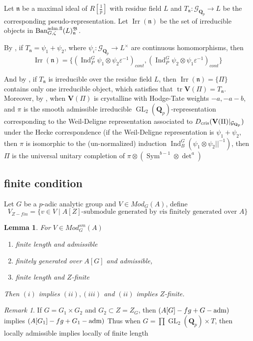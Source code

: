 \documentclass[leqno]{amsart}
\newcommand{\Ban}{\textnormal{Ban}^{\textnormal{adm.fl}}}
\newcommand{\B}{\mathfrak B}
\newcommand{\Gp}{\mathcal{G}_{\Qp}} %
\newcommand{\cris}{\textnormal{cris}}
\DeclareMathOperator{\Irr}{Irr}
\newcommand{\adm}{\textnormal{adm}}
\DeclareMathOperator{\GL}{GL}
\DeclareMathOperator{\mtr}{tr}
\DeclareMathOperator{\Sym}{Sym}
\newcommand{\Qp}{\mathbf{Q}_p}
\newcommand{\fn}{\mathfrak{n}}
\DeclareMathOperator{\Ind}{Ind}
\newtheorem{lem}[thm]{Lemma}
\theoremstyle{definition}
\theoremstyle{remark}
\newtheorem{rem}[thm]{Remark}
\begin{document}
Let $\fn$ be a maximal ideal of  $R[\frac{1}{p}]$
with residue field  $L$ and 
$T_\fn\colon \Gp\to L$ 
be the corresponding pseudo-representation.
Let  $\Irr(\fn)$
be the set of irreducible objects in  $\Ban_{G,\zeta}(L)^\B_{\fn}$.

By \cite[Cor 8.15]{pask}, 
if $T_\fn=\psi_1+\psi_2$,
where  $\psi_i\colon \Gp\to L^\times$
are continuous homomorphisms, then  
\begin{equation}\label{eq:comple1}
	\Irr(\fn)=\{(\Ind_P^G\psi_1\otimes\psi_2\varepsilon^{-1})_{cont},
	(\Ind_P^G\psi_2\otimes\psi_1\varepsilon^{-1})_{cont}\}
\end{equation}

And by \cite[Cor 8.14]{pask}, 
if $T_\fn$ is irreducible over the residue field $L$, 
then $\Irr(\fn)=\{\Pi\}$ contains only one irreducible object,
which satisfies that $\mtr\mathbf{V}(\Pi)=T_\fn$.
Moreover, by \cite[Thm. 1.3]{CDP},
when $\mathbf{V}(\Pi)$ is crystalline with Hodge-Tate weights $-a,-a-b$,
and $\pi$ is the smooth admissible irreducible
$\GL_2(\Qp)$-representation
corresponding to the Weil-Deligne representation
associated to  $D_{\cris}(\mathbf{V}(\Pi)\vert_{\Gp})$
under the Hecke correspondence
(if the Weil-Deligne representation is $\psi_1+\psi_2$,
then $\pi$ is isomorphic to 
the (un-normalized) induction $\Ind_B^G(\psi_1\otimes\psi_2||^{-1})$,
then $\Pi$ is the universal unitary completion
of  $\pi\otimes(\Sym^{b-1}\otimes \det^a)$


\subsection{finite condition}

Let $G$ be a  $p$-adic analytic group
and  $V\in Mod_G(A)$, define 
 \[
	V_{Z-fin}=
	\{v\in V\mid \text{$A[Z]$-submodule generated by  $v$
	is finitely generated over  $A$}\}
\]
\begin{lem}
	For $V\in Mod_G^{sm}(A)$
	\begin{enumerate}[label=(\alph*)]
		\item finite length and admissible
		\item finitely generated over $A[G]$
			and admissible, 
		\item finite length and $Z$-finite
	\end{enumerate}
	Then $(i)$ implies $(ii), (iii)$
	and $(ii)$ implies  $Z$-finite.
\end{lem}

\begin{rem}
	If $G=G_1\times G_2$ and  $G_2\subset Z=Z_G$,
	then  $(A[G]-fg + G-\adm)$ 
	implies  $(A[G_1]-fg + G_1-\adm)$ 
	Thus when
	$G=\prod\GL_2(\Qp)\times T$,
	then locally admissible 
	implies locally of finite length
\end{rem}
\end{document}
